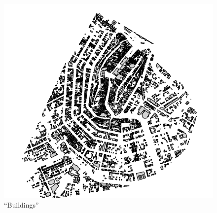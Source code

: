 \documentclass[]{book}
\theoremstyle{definition}
\theoremstyle{definition}
\theoremstyle{definition}
\theoremstyle{remark}
\begin{document}
\begin{figure}
\centering
\includegraphics{images/buildings.png}
\caption{``Buildings''}
\end{figure}

\printindex
\end{document}

